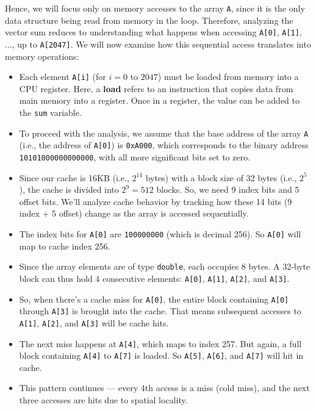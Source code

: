 \documentclass[12pt]{book}
\begin{document}
Hence, we will focus only on memory accesses to the array \texttt{A}, since it is the only data structure being read from memory in the loop. Therefore, analyzing the vector sum reduces to understanding what happens when accessing \texttt{A[0]}, \texttt{A[1]}, ..., up to \texttt{A[2047]}. We will now examine how this sequential access translates into memory operations:
\begin{itemize}
    \item Each element \texttt{A[i]} (for $i = 0$ to $2047$) must be loaded from memory into a CPU register. Here, a \textbf{load} refers to an instruction that copies data from main memory into a register. Once in a register, the value can be added to the \texttt{sum} variable.
    
    \item To proceed with the analysis, we assume that the base address of the array \texttt{A} (i.e., the address of \texttt{A[0]}) is \texttt{0xA000}, which corresponds to the binary address \texttt{10101000000000000}, with all more significant bits set to zero.
    
    \item Since our cache is 16KB (i.e., $2^{14}$ bytes) with a block size of 32 bytes (i.e., $2^5$), the cache is divided into $2^9 = 512$ blocks. So, we need 9 index bits and 5 offset bits. We’ll analyze cache behavior by tracking how these 14 bits (9 index + 5 offset) change as the array is accessed sequentially.
    
    \item The index bits for \texttt{A[0]} are \texttt{100000000} (which is decimal 256). So \texttt{A[0]} will map to cache index 256.
    
    \item Since the array elements are of type \texttt{double}, each occupies 8 bytes. A 32-byte block can thus hold 4 consecutive elements: \texttt{A[0]}, \texttt{A[1]}, \texttt{A[2]}, and \texttt{A[3]}.
    
    \item So, when there’s a cache miss for \texttt{A[0]}, the entire block containing \texttt{A[0]} through \texttt{A[3]} is brought into the cache. That means subsequent accesses to \texttt{A[1]}, \texttt{A[2]}, and \texttt{A[3]} will be cache hits.
    
    \item The next miss happens at \texttt{A[4]}, which maps to index 257. But again, a full block containing \texttt{A[4]} to \texttt{A[7]} is loaded. So \texttt{A[5]}, \texttt{A[6]}, and \texttt{A[7]} will hit in cache.
    
    \item This pattern continues — every 4th access is a miss (cold miss), and the next three accesses are hits due to spatial locality.
\end{itemize}
\end{document}
